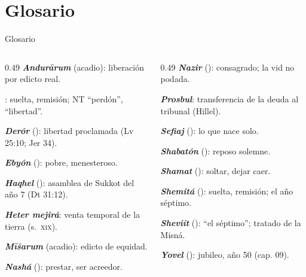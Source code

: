 \section{Glosario}

\begin{frame}{Glosario}
\fontsize{6.6}{7.8}\selectfont
\begin{columns}[t,onlytextwidth]
\begin{column}{0.49\textwidth}
\textbf{\emph{Andurārum}} (acadio): liberación por edicto real.\par
\textbf{}: suelta, remisión; NT ``perdón'', ``libertad''.\par
\textbf{\emph{Derór}} (): libertad proclamada (Lv 25:10; Jer 34).\par
\textbf{\emph{Ebyón}} (): pobre, menesteroso.\par
\textbf{\emph{Haqhel}} (): asamblea de Sukkot del año 7 (Dt 31:12).\par
\textbf{\emph{Heter mejirá}}: venta temporal de la tierra (s.~\textsc{xix}).\par
\textbf{\emph{Mīšarum}} (acadio): edicto de equidad.\par
\textbf{\emph{Nashá}} (): prestar, ser acreedor.
\end{column}
\begin{column}{0.49\textwidth}
\textbf{\emph{Nazir}} (): consagrado; la vid no podada.\par
\textbf{\emph{Prosbul}}: transferencia de la deuda al tribunal (Hillel).\par
\textbf{\emph{Sefiaj}} (): lo que nace solo.\par
\textbf{\emph{Shabatón}} (): reposo solemne.\par
\textbf{\emph{Shamat}} (): soltar, dejar caer.\par
\textbf{\emph{Shemitá}} (): suelta, remisión; el año séptimo.\par
\textbf{\emph{Sheviít}} (): ``el séptimo''; tratado de la Misná.\par
\textbf{\emph{Yovel}} (): jubileo, año 50 (cap. 09).
\end{column}
\end{columns}
\end{frame}

